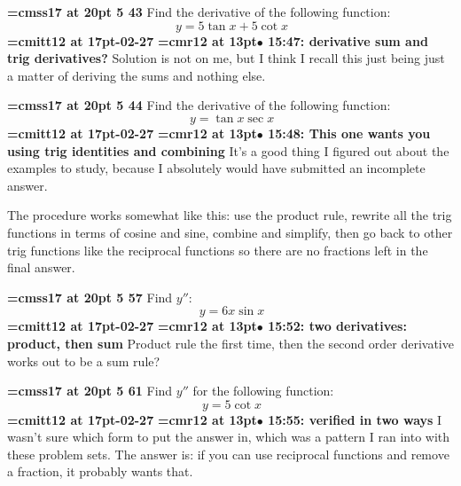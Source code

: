 {\medskip\noindent\bf\font\titlefont=cmss17 at 20pt 5 43}\medskip
Find the derivative of the following function:
$$\
y = 5 \tan x + 5 \cot x
$$
{\medskip\noindent\bf\font\titlefont=cmitt12 at 17pt-02-27}\medskip
{\smallskip\noindent\bf\font\titlefont=cmr12 at 13pt\titlefont $\bullet$ 15:47: derivative sum and trig derivatives?}\smallskip
Solution is not on me, but I think I recall this just being just a matter of deriving the sums and nothing else.
\par

{\medskip\noindent\bf\font\titlefont=cmss17 at 20pt 5 44}\medskip
Find the derivative of the following function:
$$\
y = \tan x \sec x
$$
{\medskip\noindent\bf\font\titlefont=cmitt12 at 17pt-02-27}\medskip
{\smallskip\noindent\bf\font\titlefont=cmr12 at 13pt\titlefont $\bullet$ 15:48: This one wants you using trig identities and combining}\smallskip
It's a good thing I figured out about the examples to study, because I absolutely would have submitted an incomplete answer.
\par

The procedure works somewhat like this: use the product rule, rewrite all the trig functions in terms of cosine and sine, combine and simplify, then go back to other trig functions like the reciprocal functions so there are no fractions left in the final answer.
\par

{\medskip\noindent\bf\font\titlefont=cmss17 at 20pt 5 57}\medskip
Find $y''$:
$$\
y = 6x \sin x
$$
{\medskip\noindent\bf\font\titlefont=cmitt12 at 17pt-02-27}\medskip
{\smallskip\noindent\bf\font\titlefont=cmr12 at 13pt\titlefont $\bullet$ 15:52: two derivatives: product, then sum}\smallskip
Product rule the first time, then the second order derivative works out to be a sum rule?
\par

\xrdef{node76}
{\medskip\noindent\bf\font\titlefont=cmss17 at 20pt 5 61}\medskip
Find $y''$ for the following function:
$$\
y = 5 \cot x
$$
{\medskip\noindent\bf\font\titlefont=cmitt12 at 17pt-02-27}\medskip
{\smallskip\noindent\bf\font\titlefont=cmr12 at 13pt\titlefont $\bullet$ 15:55: verified in two ways}\smallskip
I wasn't sure which form to put the answer in, which was a pattern I ran into with these problem sets. The answer is: if you can use reciprocal functions and remove a fraction, it probably wants that.
\par

